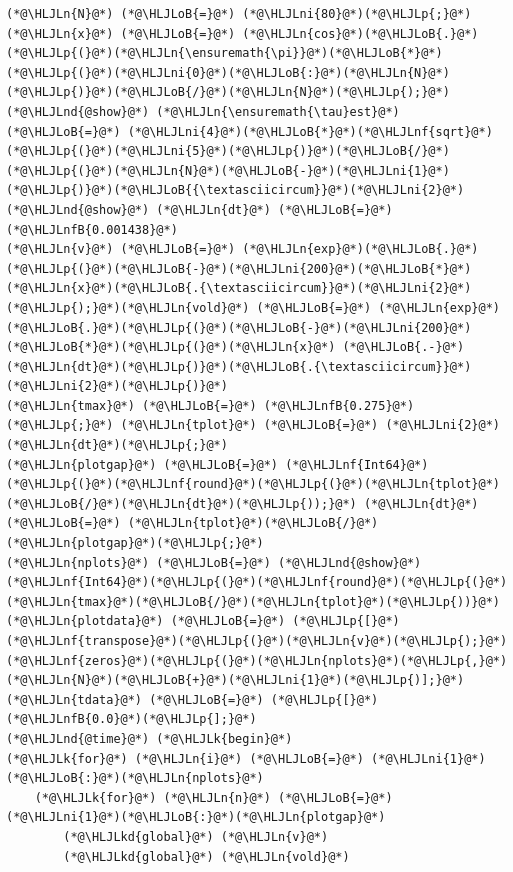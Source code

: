 \documentclass[12pt,a4paper]{article}
\newcommand{\HLJLk}[1]{\textcolor[RGB]{148,91,176}{\textbf{#1}}}
\newcommand{\HLJLkd}[1]{\textcolor[RGB]{214,102,97}{\textit{#1}}}
\newcommand{\HLJLn}[1]{#1}
\newcommand{\HLJLnd}[1]{\textcolor[RGB]{214,102,97}{#1}}
\newcommand{\HLJLnf}[1]{\textcolor[RGB]{66,102,213}{#1}}
\newcommand{\HLJLnfB}[1]{\textcolor[RGB]{59,151,46}{#1}}
\newcommand{\HLJLni}[1]{\textcolor[RGB]{59,151,46}{#1}}
\newcommand{\HLJLoB}[1]{\textcolor[RGB]{102,102,102}{\textbf{#1}}}
\newcommand{\HLJLp}[1]{#1}
\begin{document}
\begin{lstlisting}
(*@\HLJLn{N}@*) (*@\HLJLoB{=}@*) (*@\HLJLni{80}@*)(*@\HLJLp{;}@*) (*@\HLJLn{x}@*) (*@\HLJLoB{=}@*) (*@\HLJLn{cos}@*)(*@\HLJLoB{.}@*)(*@\HLJLp{(}@*)(*@\HLJLn{\ensuremath{\pi}}@*)(*@\HLJLoB{*}@*)(*@\HLJLp{(}@*)(*@\HLJLni{0}@*)(*@\HLJLoB{:}@*)(*@\HLJLn{N}@*)(*@\HLJLp{)}@*)(*@\HLJLoB{/}@*)(*@\HLJLn{N}@*)(*@\HLJLp{);}@*) 
(*@\HLJLnd{@show}@*) (*@\HLJLn{\ensuremath{\tau}est}@*) (*@\HLJLoB{=}@*) (*@\HLJLni{4}@*)(*@\HLJLoB{*}@*)(*@\HLJLnf{sqrt}@*)(*@\HLJLp{(}@*)(*@\HLJLni{5}@*)(*@\HLJLp{)}@*)(*@\HLJLoB{/}@*)(*@\HLJLp{(}@*)(*@\HLJLn{N}@*)(*@\HLJLoB{-}@*)(*@\HLJLni{1}@*)(*@\HLJLp{)}@*)(*@\HLJLoB{{\textasciicircum}}@*)(*@\HLJLni{2}@*)
(*@\HLJLnd{@show}@*) (*@\HLJLn{dt}@*) (*@\HLJLoB{=}@*) (*@\HLJLnfB{0.001438}@*)  
(*@\HLJLn{v}@*) (*@\HLJLoB{=}@*) (*@\HLJLn{exp}@*)(*@\HLJLoB{.}@*)(*@\HLJLp{(}@*)(*@\HLJLoB{-}@*)(*@\HLJLni{200}@*)(*@\HLJLoB{*}@*)(*@\HLJLn{x}@*)(*@\HLJLoB{.{\textasciicircum}}@*)(*@\HLJLni{2}@*)(*@\HLJLp{);}@*)(*@\HLJLn{vold}@*) (*@\HLJLoB{=}@*) (*@\HLJLn{exp}@*)(*@\HLJLoB{.}@*)(*@\HLJLp{(}@*)(*@\HLJLoB{-}@*)(*@\HLJLni{200}@*)(*@\HLJLoB{*}@*)(*@\HLJLp{(}@*)(*@\HLJLn{x}@*) (*@\HLJLoB{.-}@*) (*@\HLJLn{dt}@*)(*@\HLJLp{)}@*)(*@\HLJLoB{.{\textasciicircum}}@*)(*@\HLJLni{2}@*)(*@\HLJLp{)}@*)
(*@\HLJLn{tmax}@*) (*@\HLJLoB{=}@*) (*@\HLJLnfB{0.275}@*)(*@\HLJLp{;}@*) (*@\HLJLn{tplot}@*) (*@\HLJLoB{=}@*) (*@\HLJLni{2}@*)(*@\HLJLn{dt}@*)(*@\HLJLp{;}@*)
(*@\HLJLn{plotgap}@*) (*@\HLJLoB{=}@*) (*@\HLJLnf{Int64}@*)(*@\HLJLp{(}@*)(*@\HLJLnf{round}@*)(*@\HLJLp{(}@*)(*@\HLJLn{tplot}@*)(*@\HLJLoB{/}@*)(*@\HLJLn{dt}@*)(*@\HLJLp{));}@*) (*@\HLJLn{dt}@*) (*@\HLJLoB{=}@*) (*@\HLJLn{tplot}@*)(*@\HLJLoB{/}@*)(*@\HLJLn{plotgap}@*)(*@\HLJLp{;}@*)
(*@\HLJLn{nplots}@*) (*@\HLJLoB{=}@*) (*@\HLJLnd{@show}@*) (*@\HLJLnf{Int64}@*)(*@\HLJLp{(}@*)(*@\HLJLnf{round}@*)(*@\HLJLp{(}@*)(*@\HLJLn{tmax}@*)(*@\HLJLoB{/}@*)(*@\HLJLn{tplot}@*)(*@\HLJLp{))}@*)
(*@\HLJLn{plotdata}@*) (*@\HLJLoB{=}@*) (*@\HLJLp{[}@*)(*@\HLJLnf{transpose}@*)(*@\HLJLp{(}@*)(*@\HLJLn{v}@*)(*@\HLJLp{);}@*) (*@\HLJLnf{zeros}@*)(*@\HLJLp{(}@*)(*@\HLJLn{nplots}@*)(*@\HLJLp{,}@*)(*@\HLJLn{N}@*)(*@\HLJLoB{+}@*)(*@\HLJLni{1}@*)(*@\HLJLp{)];}@*) (*@\HLJLn{tdata}@*) (*@\HLJLoB{=}@*) (*@\HLJLp{[}@*)(*@\HLJLnfB{0.0}@*)(*@\HLJLp{];}@*)
(*@\HLJLnd{@time}@*) (*@\HLJLk{begin}@*)
(*@\HLJLk{for}@*) (*@\HLJLn{i}@*) (*@\HLJLoB{=}@*) (*@\HLJLni{1}@*)(*@\HLJLoB{:}@*)(*@\HLJLn{nplots}@*)
    (*@\HLJLk{for}@*) (*@\HLJLn{n}@*) (*@\HLJLoB{=}@*) (*@\HLJLni{1}@*)(*@\HLJLoB{:}@*)(*@\HLJLn{plotgap}@*)
        (*@\HLJLkd{global}@*) (*@\HLJLn{v}@*)
        (*@\HLJLkd{global}@*) (*@\HLJLn{vold}@*)

\end{lstlisting}
\end{document}
